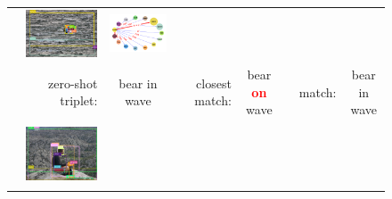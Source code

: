 \begin{figure}
\begin{tabular}{p{0.3cm}|rc|p{0.1cm}rc|p{0.1cm}rc}
		& \includegraphics[width=\figwidthvis, align=c]{2334137_ours_zs_ours.png} & 
		\includegraphics[width=\figwidthvis, align=c]{2334137_ours_zs_graph_ours.png} \Tstrutmore\Bstrut\\
		& zero-shot triplet: & {bear in wave} & & closest match: & bear \textcolor{red}{\textbf{on}} wave & & match: & bear in wave \Bstrut\\
		\cline{2-9} 
		& \includegraphics[width=\figwidthvis, height=1.8cm, align=c]{2320504_ours_zs.png} &

\end{tabular}
\end{figure}
